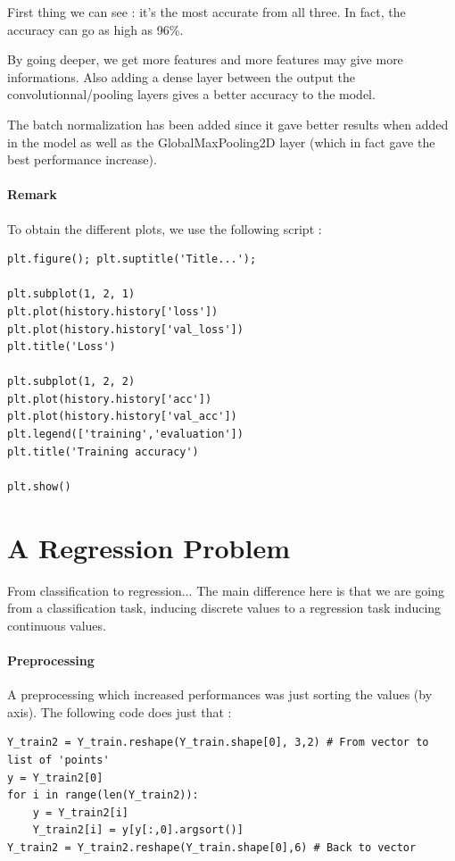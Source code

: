 \documentclass[]{article}
\begin{document}
First thing we can see : it's the most accurate from all three. In fact, the accuracy can go as high as 96\%.

By going deeper, we get more features and more features may give more informations. Also adding a dense layer between the output the convolutionnal/pooling layers gives a better accuracy to the model.

The batch normalization has been added since it gave better results when added in the model as well as the GlobalMaxPooling2D layer (which in fact gave the best performance increase).

\paragraph{Remark}

To obtain the different plots, we use the following script :

\begin{verbatim}
plt.figure(); plt.suptitle('Title...');

plt.subplot(1, 2, 1)
plt.plot(history.history['loss'])
plt.plot(history.history['val_loss'])
plt.title('Loss')

plt.subplot(1, 2, 2)
plt.plot(history.history['acc'])
plt.plot(history.history['val_acc'])
plt.legend(['training','evaluation'])
plt.title('Training accuracy')

plt.show()
\end{verbatim}

\section{A Regression Problem}

From classification to regression... The main difference here is that we are going from a classification task, inducing discrete values to a regression task inducing continuous values.

\paragraph{Preprocessing} A preprocessing which increased performances was just sorting the values (by axis). The following code does just that :

\begin{verbatim}
Y_train2 = Y_train.reshape(Y_train.shape[0], 3,2) # From vector to list of 'points'
y = Y_train2[0]
for i in range(len(Y_train2)):
	y = Y_train2[i]
	Y_train2[i] = y[y[:,0].argsort()]
Y_train2 = Y_train2.reshape(Y_train.shape[0],6) # Back to vector
\end{verbatim}
\end{document}
